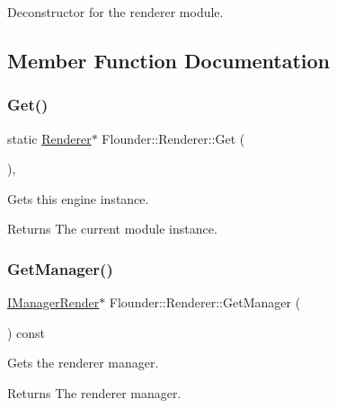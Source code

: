 Deconstructor for the renderer module. 



\subsection{Member Function Documentation}
\mbox{\label{class_flounder_1_1_renderer_abd1a8162921416ef0dea812685d7a994}} 
\subsubsection{\texorpdfstring{Get()}{Get()}}
{\footnotesize\ttfamily static \hyperlink{class_flounder_1_1_renderer}{Renderer}$\ast$ Flounder\+::\+Renderer\+::\+Get (\begin{DoxyParamCaption}{ }\end{DoxyParamCaption})\hspace{0.3cm}{\ttfamily [inline]}, {\ttfamily [static]}}



Gets this engine instance. 

\begin{DoxyReturn}{Returns}
The current module instance. 
\end{DoxyReturn}
\mbox{\label{class_flounder_1_1_renderer_ab9f4629be59275b0f365460a9f47bba7}} 
\subsubsection{\texorpdfstring{Get\+Manager()}{GetManager()}}
{\footnotesize\ttfamily \hyperlink{class_flounder_1_1_i_manager_render}{I\+Manager\+Render}$\ast$ Flounder\+::\+Renderer\+::\+Get\+Manager (\begin{DoxyParamCaption}{ }\end{DoxyParamCaption}) const\hspace{0.3cm}{\ttfamily [inline]}}



Gets the renderer manager. 

\begin{DoxyReturn}{Returns}
The renderer manager. 
\end{DoxyReturn}
\mbox{\label{class_flounder_1_1_renderer_a9a3446860570828d9dab930c32ffce5f}} 
